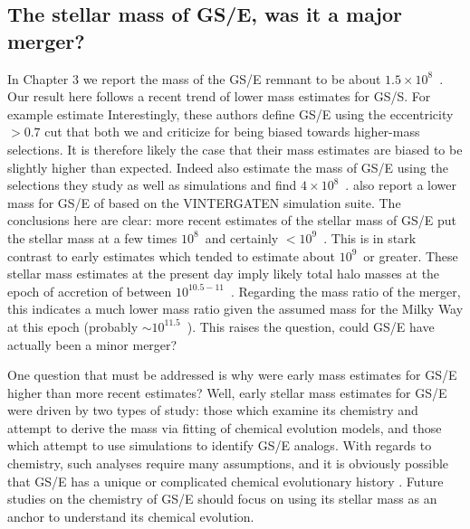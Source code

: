 \subsection{The stellar mass of GS/E, was it a major merger?}

In Chapter 3 we report the mass of the GS/E remnant to be about $1.5\times10^{8}$~\Msun. Our result here follows a recent trend of lower mass estimates for GS/S. For example \textcite{han23} estimate  Interestingly, these authors define GS/E using the eccentricity~$> 0.7$ cut that both we and \textcite{carrillo23} criticize for being biased towards higher-mass selections. It is therefore likely the case that their mass estimates are biased to be slightly higher than expected. Indeed \textcite{carrillo23} also estimate the mass of GS/E using the selections they study as well as simulations and find $4\times10^{8}$~\Msun. \textcite{rey23} also report a lower mass for GS/E of  based on the VINTERGATEN simulation suite. The conclusions here are clear: more recent estimates of the stellar mass of GS/E put the stellar mass at a few times $10^{8}$~\Msun and certainly $< 10^{9}$~\Msun. This is in stark contrast to early estimates which tended to estimate about $10^{9}$~\Msun or greater. These stellar mass estimates at the present day imply likely total halo masses at the epoch of accretion of between $10^{10.5-11}$~\Msun. Regarding the mass ratio of the merger, this indicates a much lower mass ratio given the assumed mass for the Milky Way at this epoch (probably $\sim 10^{11.5}$~\Msun). This raises the question, could GS/E have actually been a minor merger?

One question that must be addressed is why were early mass estimates for GS/E higher than more recent estimates? Well, early stellar mass estimates for GS/E were driven by two types of study: those which examine its chemistry and attempt to derive the mass via fitting of chemical evolution models, and those which attempt to use simulations to identify GS/E analogs. With regards to chemistry, such analyses require many assumptions, and it is obviously possible that GS/E has a unique or complicated chemical evolutionary history \parencite[e.g. as argued by][]{matsuno21,sanders21}. Future studies on the chemistry of GS/E should focus on using its stellar mass as an anchor to understand its chemical evolution. 

